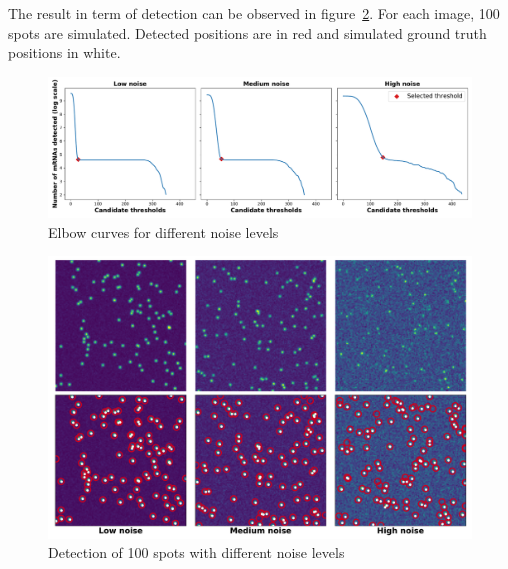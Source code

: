 The result in term of detection can be observed in figure~\ref{fig:general_spots_detection}.
For each image, 100 spots are simulated.
Detected positions are in red and simulated ground truth positions in white.

\vfill

\begin{figure}[h]
    \centering
    \includegraphics[width=1\textwidth]{figures/appendix/spots_elbow}
    \caption{Elbow curves for different noise levels}
    \label{fig:general_spots_elbow}
\end{figure}

\begin{figure}[h]
    \centering
    \includegraphics[width=1\textwidth]{figures/appendix/spots_example}
    \caption{Detection of 100 spots with different noise levels}
    \label{fig:general_spots_detection}
\end{figure}
